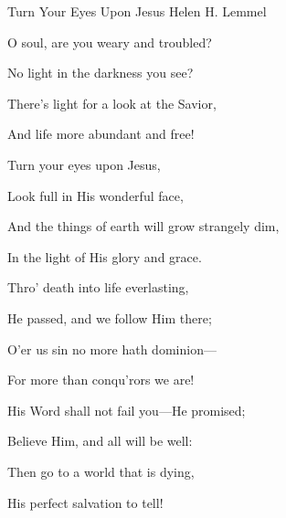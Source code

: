 \documentclass[12pt]{book}
\begin{document}
\begin{song}{Turn Your Eyes Upon Jesus}{}
  {\SBPubDom}
  {Helen H. Lemmel}
  {}
  {}

  \begin{SBVerse}
    O soul, are you weary and troubled?

    No light in the darkness you see?

    There's light for a look at the Savior,

    And life more abundant and free!
  \end{SBVerse}

  \begin{SBOpGroup}
    Turn your eyes upon Jesus,

    Look full in His wonderful face,

    And the things of earth will grow strangely dim,

    In the light of His glory and grace.
  \end{SBOpGroup}

  \begin{SBVerse}
    Thro' death into life everlasting,

    He passed, and we follow Him there;

    O'er us sin no more hath dominion---

    For more than conqu'rors we are!
  \end{SBVerse}

  \begin{SBVerse}
    His Word shall not fail you---He promised;

    Believe Him, and all will be well:

    Then go to a world that is dying,

    His perfect salvation to tell!
  \end{SBVerse}
\end{song}
\end{document}
